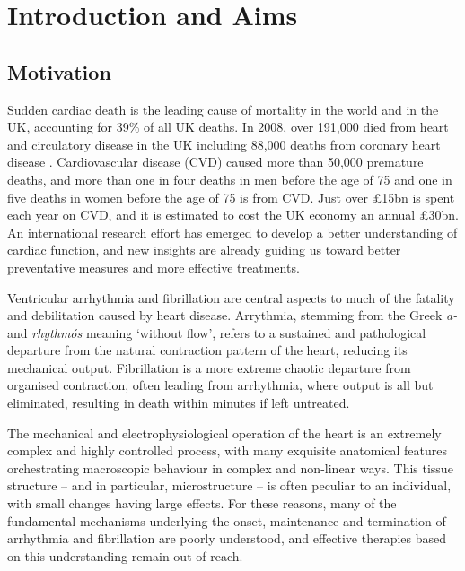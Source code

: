 \chapter{Introduction and Aims}
\dblspace

\section{Motivation}
\label{sec:intro:motivation}
  Sudden cardiac death is the leading cause of mortality in the world and in the UK, accounting for 39\% of all UK deaths. In 2008, over 191,000 died from heart and circulatory disease in the UK including 88,000 deaths
from coronary heart disease \cite{bhf2010}. Cardiovascular disease (CVD) caused more than 50,000 premature deaths, and more than one in four deaths in men before the age of 75 and one in five deaths in women before the age of 75 is from CVD. Just over \pounds15bn is spent each year on CVD, and it is estimated to cost the UK economy an annual \pounds30bn. An international research effort has emerged to develop a better understanding of cardiac function, and new insights are already guiding us toward better preventative measures and more effective treatments.

  Ventricular arrhythmia and fibrillation are central aspects to much of the fatality and debilitation caused by heart disease. Arrythmia, stemming from the Greek \emph{a-} and \emph{rhythm\'os} meaning `without flow', refers to a sustained and pathological departure from the natural contraction pattern of the heart, reducing its mechanical output. Fibrillation is a more extreme chaotic departure from organised contraction, often leading from arrhythmia, where output is all but eliminated, resulting in death within minutes if left untreated.
  
  The mechanical and electrophysiological operation of the heart is an extremely complex and highly controlled process, with many exquisite anatomical features orchestrating macroscopic behaviour in complex and non-linear ways. This tissue structure -- and in particular, microstructure -- is often peculiar to an individual, with small changes having large effects. For these reasons, many of the fundamental mechanisms underlying the onset, maintenance and termination of arrhythmia and fibrillation are poorly understood, and effective therapies based on this understanding remain out of reach.
  
